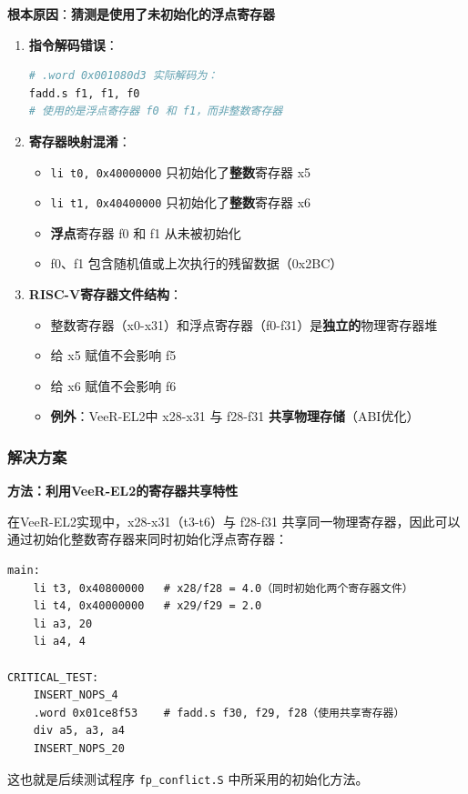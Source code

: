 \documentclass[12pt,a4paper]{article}
\begin{document}
\textbf{根本原因}：\textbf{猜测是使用了未初始化的浮点寄存器}

\begin{enumerate}[itemsep=0pt, parsep=3pt]
    \item \textbf{指令解码错误}：
    \begin{lstlisting}[language=Python]
# .word 0x001080d3 实际解码为：
fadd.s f1, f1, f0
# 使用的是浮点寄存器 f0 和 f1，而非整数寄存器
    \end{lstlisting}
    
    \item \textbf{寄存器映射混淆}：
    \begin{itemize}[itemsep=0pt, parsep=3pt]
        \item \texttt{li t0, 0x40000000} 只初始化了\textbf{整数}寄存器 x5
        \item \texttt{li t1, 0x40400000} 只初始化了\textbf{整数}寄存器 x6
        \item \textbf{浮点}寄存器 f0 和 f1 从未被初始化
        \item f0、f1 包含随机值或上次执行的残留数据（0x2BC）
    \end{itemize}
    
    \item \textbf{RISC-V寄存器文件结构}：
    \begin{itemize}[itemsep=0pt, parsep=3pt]
        \item 整数寄存器（x0-x31）和浮点寄存器（f0-f31）是\textbf{独立的}物理寄存器堆
        \item 给 x5 赋值不会影响 f5
        \item 给 x6 赋值不会影响 f6
        \item \textbf{例外}：VeeR-EL2中 x28-x31 与 f28-f31 \textbf{共享物理存储}（ABI优化）
    \end{itemize}
\end{enumerate}

\subsubsection{解决方案}

\textbf{方法：利用VeeR-EL2的寄存器共享特性}

在VeeR-EL2实现中，x28-x31（t3-t6）与 f28-f31 共享同一物理寄存器，因此可以通过初始化整数寄存器来同时初始化浮点寄存器：

\begin{lstlisting}[language={[x86masm]Assembler}]
main:
    li t3, 0x40800000   # x28/f28 = 4.0（同时初始化两个寄存器文件）
    li t4, 0x40000000   # x29/f29 = 2.0
    li a3, 20
    li a4, 4

CRITICAL_TEST:
    INSERT_NOPS_4
    .word 0x01ce8f53    # fadd.s f30, f29, f28（使用共享寄存器）
    div a5, a3, a4
    INSERT_NOPS_20
\end{lstlisting}
这也就是后续测试程序 \texttt{fp\_conflict.S} 中所采用的初始化方法。
\end{document}
